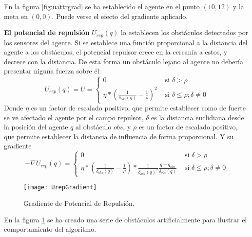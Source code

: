 En la figura \ref{fig:uattrgrad} se ha establecido el agente en el punto $(10,12)$ y la meta en $(0,0)$. Puede verse el efecto del gradiente aplicado.

\textbf{El potencial de repulsión} $U_{rep}(q)$ lo establecen los obstáculos detectados por los sensores del agente. Si se establece una función proporcional a la distancia del agente a los obstáculos, el potencial repulsor crece en la cercanía a estos, y decrece con la distancia. De esta forma un obstáculo lejano al agente no debería presentar niguna fuerza sobre él:
\begin{equation}
U_{rep}(q) = U = \begin{cases}
0 & \text{ si } \delta > \rho \\ 
\eta * (\frac{1}{\delta_{obs}(q)}-\frac{1}{\rho})^2 & \text{ si } \delta \leq \rho; \delta \neq 0 
\end{cases}
\label{equation:Urepq}
\end{equation}
Donde $\eta$ es un factor de escalado positivo, que permite establecer como de fuerte se ve afectado el agente por el campo repulsor, $\delta$ es la distancia euclidiana desde la posición del agente $q$ al obstáculo $obs$, y $\rho$ es un factor de escalado positivo, que permite establecer la distancia de influencia de forma proporcional. Y su gradiente
\begin{equation}
-\nabla U_{rep}(q) = \begin{cases} 0 & \text{ si } \delta > \rho \\
\eta * (\frac{1}{\delta_{obs}(q)}-\frac{1}{\rho}) * \frac{1}{\delta_{obs}(q)^2}\frac{q-q_{obs}}{\delta_{obs}(q)} & \text{ si }  \delta \leq \rho; \delta \neq 0  
\end{cases}
\label{equation:dUrepq}
\end{equation}
\begin{figure}[H]
	\centering
	\texttt{[image: UrepGradient]}
	\caption{Gradiente de Potencial de Repulsión.}\label{fig:urepgrad}
\end{figure}

 En la figura \ref{fig:urepgrad} se ha creado una serie de obstáculos artificialmente para ilustrar el comportamiento del algoritmo. 

 \newpage

